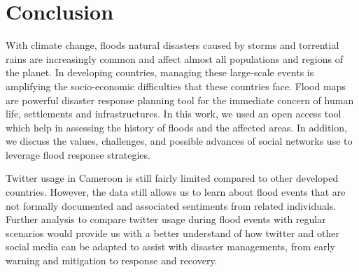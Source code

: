 \section{Conclusion}
With climate change, floods natural disasters caused by storms and torrential rains are increasingly common and affect almost all populations and regions of the planet. In developing countries, managing these large-scale events is amplifying the socio-economic difficulties that these countries face. Flood maps are powerful disaster response planning tool for the immediate concern of human life, settlements and infrastructures. In this work, we used an open access tool which help in assessing the history of floods and the affected areas. In addition, we discuss the values, challenges, and possible advances of social networks use to leverage flood response strategies.

Twitter usage in Cameroon is still fairly limited compared to other developed countries. However, the data still allows us to learn about flood events that are not formally documented and associated sentiments from related individuals. Further analysis to compare twitter usage during flood events with regular scenarios would provide us with a better understand of how twitter and other social media can be adapted to assist with disaster managements, from early warning and mitigation to response and recovery.


